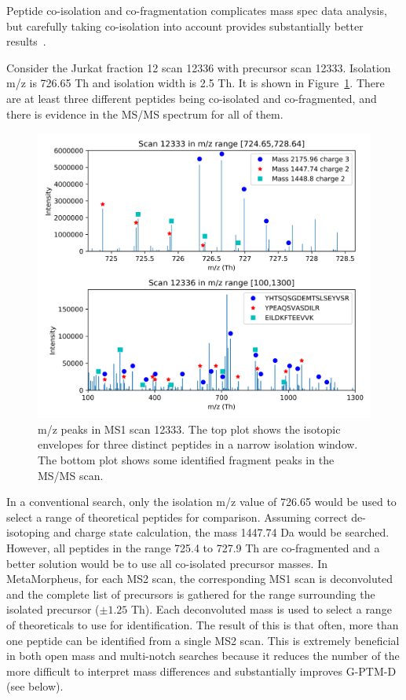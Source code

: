 \documentclass[journal=jprobs,manuscript=article]{achemso}
\begin{document}
Peptide co-isolation and co-fragmentation complicates mass spec data analysis, but carefully taking co-isolation into account provides substantially better results~\cite{Zhang2014}.

Consider the Jurkat fraction 12 scan 12336 with precursor scan 12333.
Isolation m/z is 726.65 Th and isolation width is 2.5 Th.
It is shown in Figure~\ref{fig:fig5-coIsolationSpectrum}.
There are at least three different peptides being co-isolated and co-fragmented, and there is evidence in the MS/MS spectrum for all of them.

\begin{figure}[H]
\includegraphics{fig5-coIsolationSpectrum.png}
\caption{m/z peaks in MS1 scan 12333. The top plot shows the isotopic envelopes for three distinct peptides in a narrow isolation window. The bottom plot shows some identified fragment peaks in the MS/MS scan.}
\label{fig:fig5-coIsolationSpectrum}
\end{figure}

In a conventional search, only the isolation m/z value of 726.65 would be used to select a range of theoretical peptides for comparison.
Assuming correct de-isotoping and charge state calculation, the mass 1447.74 Da would be searched.
However, all peptides in the range 725.4 to 727.9 Th are co-fragmented and a better solution would be to use all co-isolated precursor masses.
In MetaMorpheus, for each MS2 scan, the corresponding MS1 scan is deconvoluted and the complete list of precursors is gathered for the range surrounding the isolated precursor ($\pm 1.25$ Th).
Each deconvoluted mass is used to select a range of theoreticals to use for identification.
The result of this is that often, more than one peptide can be identified from a single MS2 scan.
This is extremely beneficial in both open mass and multi-notch searches because it reduces the number of the more difficult to interpret mass differences and substantially improves G-PTM-D (see below).
\end{document}
